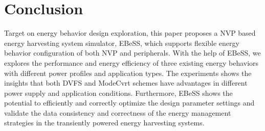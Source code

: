 \section{Conclusion}	\label{sec:sum}
%
Target on energy behavior design exploration, this paper proposes a NVP based energy harvesting system simulator, EBeSS, which supports flexible energy behavior configuration of both NVP and peripherals.
With the help of EBeSS, we explores the performance and energy efficiency of three existing energy behaviors with different power profiles and application types. 
The experiments shows the insights that both DVFS and ModeCvrt schemes have advantages in different power supply and application conditions.
Furthermore, EBeSS shows the potential to efficiently and correctly optimize the design parameter settings and validate the data consistency and correctness of the energy management strategies in the transiently powered energy harvesting systems.

\begin{comment}

 
\end{comment}